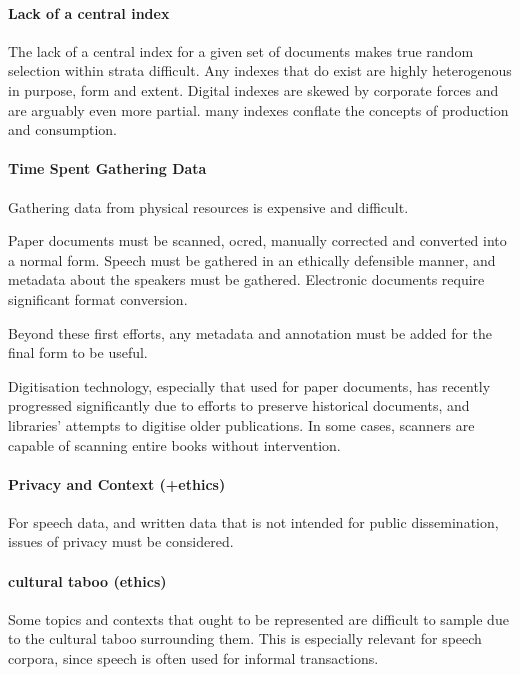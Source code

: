 
\paragraph{Lack of a central index}
The lack of a central index for a given set of documents makes true random selection within strata difficult. Any indexes that do exist are highly heterogenous in purpose, form and extent. Digital indexes are skewed by corporate forces and are arguably even more partial.  many indexes conflate the concepts of production and consumption.




\paragraph{Time Spent Gathering Data}
Gathering data from physical resources is expensive and difficult.  

Paper documents must be scanned, ocred, manually corrected and converted into a normal form. Speech must be gathered in an ethically defensible manner, and metadata about the speakers must be gathered. Electronic documents require significant format conversion.

Beyond these first efforts, any metadata and annotation must be added for the final form to be useful.

Digitisation technology, especially that used for paper documents, has recently progressed significantly due to efforts to preserve historical documents, and libraries' attempts to digitise older publications. In some cases, scanners are capable of scanning entire books without intervention.




\paragraph{Privacy and Context (+ethics)}
For speech data, and written data that is not intended for public dissemination, issues of privacy must be considered.



\paragraph{ cultural taboo (ethics)}
Some topics and contexts that ought to be represented are difficult to sample due to the cultural taboo surrounding them. This is especially relevant for speech corpora, since speech is often used for informal transactions.


